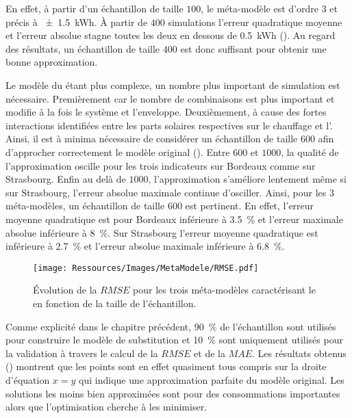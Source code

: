 En effet, à partir d’un échantillon de taille $100$, le méta-modèle est d’ordre $3$ et précis à
\SI{+- 1.5}{kWh}. À partir de $400$ simulations l’erreur quadratique moyenne et l’erreur
absolue stagne toutes les deux en dessous de \SI{0.5}{kWh} ().
Au regard des résultats, un échantillon de taille $400$ est donc suffisant pour obtenir
une bonne approximation.

Le modèle du  étant plus complexe, un nombre plus important de simulation est
nécessaire. Premièrement car le nombre de combinaisons est plus important et modifie à la
fois le système et l’enveloppe. Deuxièmement, à cause des fortes interactions identifiées
entre les parts solaires respectives sur le chauffage et l’. Ainsi, il est à
minima nécessaire de considérer un échantillon de taille $600$ afin d’approcher
correctement le modèle original (). Entre $600$ et $1000$, la qualité
de l’approximation oscille pour les trois indicateurs sur Bordeaux comme sur Strasbourg.
Enfin au delà de $1000$, l’approximation s’améliore lentement même si sur Strasbourg,
l’erreur absolue maximale continue d’osciller. Ainsi, pour les $3$ méta-modèles, un
échantillon de taille $600$ est pertinent. En effet, l’erreur moyenne quadratique est pour
Bordeaux inférieure à \SI{3.5}{\percent} et l’erreur maximale absolue inférieure à \SI{8}{\percent}.
Sur Strasbourg l’erreur moyenne quadratique est inférieure à \SI{2.7}{\percent} et
l’erreur absolue maximale inférieure à \SI{6.8}{\percent}.

\begin{figure}
    \centering
    \texttt{[image: Ressources/Images/MetaModele/RMSE.pdf]}
    \caption[Évolution de la $RMSE$ sur le  en fonction de l’échantillon]
            {Évolution de la $RMSE$ pour les trois méta-modèles caractérisant le 
             en fonction de la taille de l’échantillon.}
    \label{fig:rmse_mae}
\end{figure}

Comme explicité dans le chapitre précédent, \SI{90}{\percent} de l’échantillon sont utilisés
pour construire le modèle de substitution et \SI{10}{\percent} sont uniquement
utilisés pour la validation à travers le calcul de la $RMSE$ et de la $MAE$.
Les résultats obtenus () montrent que les points sont en
effet quasiment tous compris sur la droite d’équation $x = y$ qui indique une approximation
parfaite du modèle original. Les solutions les moins bien approximées sont pour des
consommations importantes alors que l’optimisation cherche à les minimiser.

